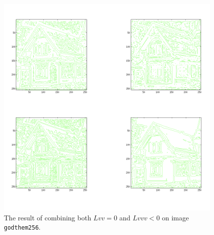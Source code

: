 \begin{figure}[H]
	\centering
	\includegraphics[scale=0.6]{./images/Q6/house_combo.png}
  \caption{The result of combining both $Lvv = 0$ and $Lvvv < 0$ on image \texttt{godthem256}.}
	\label{fig:Q6_house}
\end{figure}


